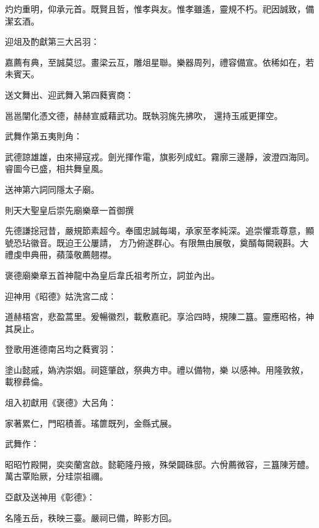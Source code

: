 \begin{pinyinscope}
 灼灼重明，仰承元首。既賢且哲，惟孝與友。惟孝雖遙，靈規不朽。祀因誠致，備潔玄酒。



 迎俎及酌獻第三大呂羽：



 嘉薦有典，至誠莫愆。畫梁云互，雕俎星聯。樂器周列，禮容備宣。依稀如在，若未賓天。



 送文舞出、迎武舞入第四蕤賓商：



 邕邕闡化憑文德，赫赫宣威藉武功。既執羽旄先拂吹，
 還持玉戚更揮空。



 武舞作第五夷則角：



 武德諒雄雄，由來掃寇戎。劍光揮作電，旗影列成虹。霧廓三邊靜，波澄四海同。睿圖今已盛，相共舞皇風。



 送神第六詞同隱太子廟。



 則天大聖皇后崇先廟樂章一首御撰



 先德謙捴冠昔，嚴規節素超今。奉國忠誠每竭，承家至孝純深。追崇懼乖尊意，顯號恐玷徽音。既迫王公屢請，
 方乃俯遂群心。有限無由展敬，奠醑每闕親斟。大禮虔申典冊，蘋藻敬薦翹襟。



 褒德廟樂章五首神龍中為皇后韋氏祖考所立，詞並內出。



 迎神用《昭德》姑洗宮二成：



 道赫梧宮，悲盈蒿里。爰暢徽烈，載敷嘉祀。享洽四時，規陳二簋。靈應昭格，神其戾止。



 登歌用進德南呂均之蕤賓羽：



 塗山懿戚，媯汭崇姻。祠筵肇啟，祭典方申。禮以備物，樂
 以感神。用隆敦敘，載穆彞倫。



 俎入初獻用《褒德》大呂角：



 家著累仁，門昭積善。瑤篚既列，金縣式展。



 武舞作：



 昭昭竹殿開，奕奕蘭宮啟。懿範隆丹掖，殊榮闢硃邸。六佾薦微容，三簋陳芳醴。萬古覃貽厥，分珪崇祖禰。



 亞獻及送神用《彰德》：



 名隆五岳，秩映三臺。嚴祠已備，睟影方回。



\end{pinyinscope}